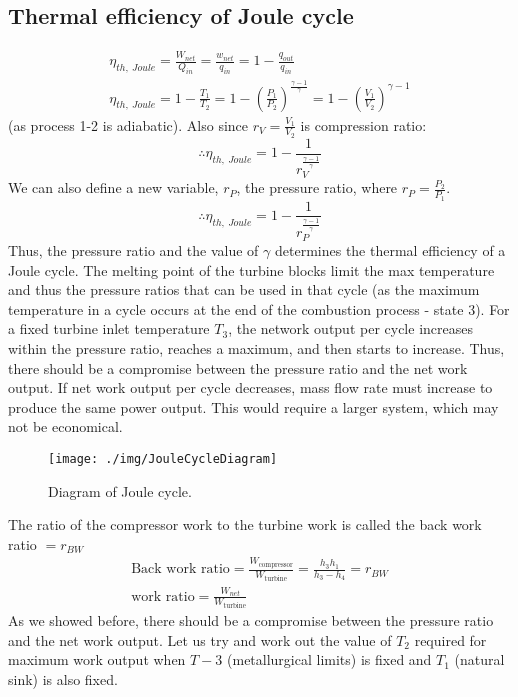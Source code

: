 \subsection{Thermal efficiency of Joule cycle}
\begin{gather}
  \eta_{th, \ Joule} = \frac{W_{net}}{Q_{in}} = \frac{w_{net}}{q_{in}} = 1 - \frac{q_{out}}{q_{in}}\\
  \eta_{th, \ Joule} = 1- \frac{T_1}{T_2} = 1 - \left( \frac{P_1}{P_2} \right)^{\frac{\gamma - 1}{\gamma}} = 1 - \left( \frac{V_1}{V_2} \right)^{\gamma -1}
\end{gather}
(as process 1-2 is adiabatic). Also since $r_V = \frac{V_1}{V_2}$ is compression ratio:
\begin{equation}
  \therefore \eta_{th, \ Joule} = 1 - \frac{1}{r_V^{\frac{\gamma -1}{\gamma}}}
\end{equation}
We can also define a new variable, $r_P$, the pressure ratio, where $r_P = \frac{P_2}{P_1}$.
\begin{equation}
  \therefore \eta_{th, \ Joule} = 1 - \frac{1}{r_P^{\frac{\gamma -1}{\gamma}}}
\end{equation}
Thus, the pressure ratio and the value of $\gamma$ determines the thermal efficiency of a Joule cycle. The melting point of the turbine blocks limit the max temperature and thus the pressure ratios that can be used in that cycle (as the maximum temperature in a cycle occurs at the end of the combustion process - state 3). For a fixed turbine inlet temperature $T_3$, the network output per cycle increases within the pressure ratio, reaches a maximum, and then starts to increase. Thus, there should be a compromise between the pressure ratio and the net work output. If net work output per cycle decreases, mass flow rate must increase to produce the same power output. This would require a larger system, which may not be economical.
\begin{figure}
  \centering
  \texttt{[image: ./img/JouleCycleDiagram]}
  \caption{Diagram of Joule cycle.}
\end{figure}
The ratio of the compressor work to the turbine work is called the back work ratio $= r_{BW}$
\begin{gather}
  \textrm{Back work ratio} = \frac{W_{\textrm{compressor}}}{W_{\textrm{turbine}}} = \frac{h_3 h_1}{h_3 - h_4} = r_{BW}\\
  \textrm{work ratio} = \frac{W_{net}}{W_{\textrm{turbine}}}
\end{gather}
As we showed before, there should be a compromise between the pressure ratio and the net work output. Let us try and work out the value of $T_2$ required for maximum work output when $T-3$ (metallurgical limits) is fixed and $T_1$ (natural sink) is also fixed.
